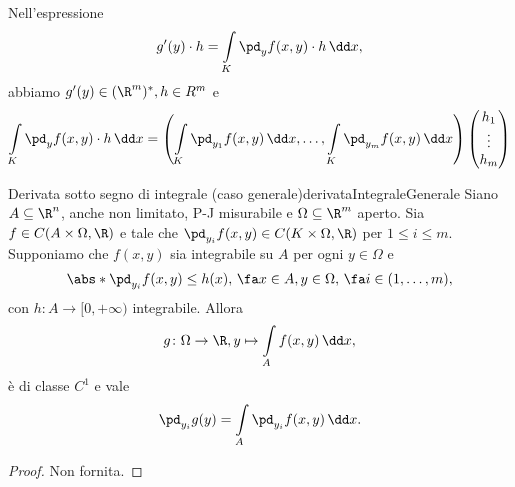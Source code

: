 \begin{oss}
	Nell'espressione
	\[
		g'(y) \cdot h = \int\limits_K \pd_y f(x,y) \cdot h\,\dd x,
	\]
	abbiamo \(g'(y)\in (\R^m)^*, h\in R^m\) e
	\[
		\int\limits_K \pd_y f(x,y) \cdot h\,\dd x = \left( \int\limits_K \pd_{y_1}f(x,y)\,\dd x, \ldots, \int\limits_K \pd_{y_m} f(x,y)\,\dd x \right)
		\begin{pmatrix}
			h_1    \\
			\vdots \\
			h_m
		\end{pmatrix}
	\]
\end{oss}

\begin{teor}{Derivata sotto segno di integrale (caso generale)}{derivataIntegraleGenerale}
	Siano \(A \subseteq \R^n\), anche non limitato, P-J misurabile e \(\Omega \subseteq \R^m\) aperto.
	Sia \(f\in C(A\times \Omega, \R)\) e tale che \(\pd_{y_i}f(x,y)\in C(K \times \Omega, \R)\) per \(1\le i\le m\).
	Supponiamo che \(f(x,y)\) sia integrabile su \(A\) per ogni \(y\in \Omega\) e
	\[
		\abs*{\pd_{y_i}f(x,y)} \le h(x),\,\fa x \in A,y \in \Omega,\,\fa i \in (1,\ldots,m),
	\]
	con \(h\colon A \to [0,+\infty)\) integrabile.
	Allora
	\[
		g\colon \Omega \to \R, y \mapsto \int\limits_A f(x,y)\,\dd x,
	\]
	è di classe \(C^1\) e vale
	\[
		\pd_{y_i} g(y) = \int\limits_A \pd_{y_i} f(x,y)\,\dd x.
	\]
\end{teor}

\begin{proof}
	Non fornita.
\end{proof}

